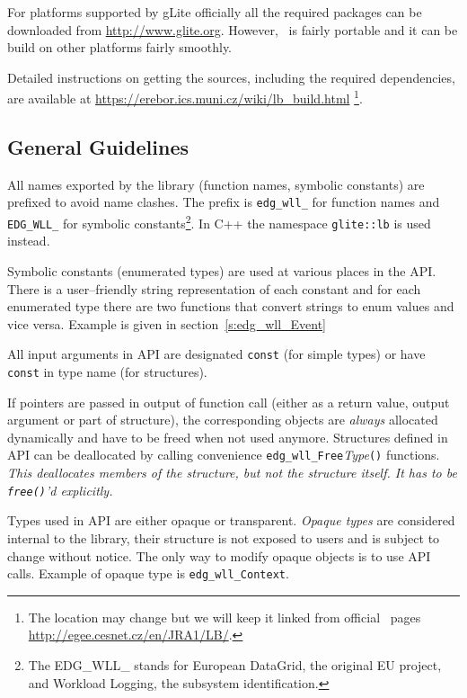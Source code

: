 For platforms supported by gLite officially all the required packages
can be downloaded from \url{http://www.glite.org}.
However, \LB\ is fairly portable and it can be build on other
platforms fairly smoothly.

Detailed instructions on getting the sources, including the required
dependencies, are available at
\url{https://erebor.ics.muni.cz/wiki/lb_build.html}
\footnote{The location may change
but we will keep it linked from 
official \LB\ pages
\url{http://egee.cesnet.cz/en/JRA1/LB/}.}.


\subsection{General Guidelines}

%
All names exported by the \LB library (function names, symbolic
constants) are prefixed to avoid name clashes. The prefix is
\verb'edg_wll_' for function names and \verb'EDG_WLL_' for
symbolic constants\footnote{The EDG\_WLL\_ stands for European
DataGrid, the original EU project, and Workload Logging, the subsystem
identification.}. In C++ the namespace \verb'glite::lb' is used
instead.

%
Symbolic constants (\ie enumerated types) are used at various places in the \LB
API. There is a user--friendly string representation of each
constant and for each enumerated type there are two functions that
convert strings to enum values and vice versa. Example is given in
section~\ref{s:edg_wll_Event}

%
All input arguments in \LB API are designated \verb'const' (for simple
types) or have \verb'const' in type name (for structures).

If pointers are passed in output of function call (either as a return
value, output argument or part of structure), the corresponding
objects are \emph{always} allocated dynamically and have to be freed
when not used anymore. Structures defined in \LB API can be
deallocated by calling convenience
\verb'edg_wll_Free'\textit{Type}\verb'()' functions. {\it This
deallocates members of the structure, but not the structure itself. It
has to be \verb'free()''d explicitly.}

%
Types used in \LB API are either opaque or transparent. \textit{Opaque
types} are considered internal to the library, their structure is not
exposed to users and is subject to change without notice. The only way
to modify opaque objects is to use API calls. Example of opaque type
is \verb'edg_wll_Context'.


